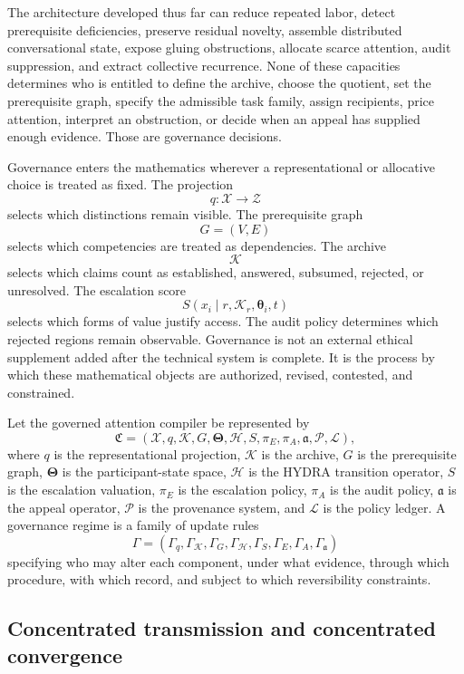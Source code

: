 \documentclass[11pt]{article}
\theoremstyle{definition}
\newcommand{\K}{\mathcal{K}}
\newcommand{\ThetaSpace}{\boldsymbol{\Theta}}
\newcommand{\thetaState}{\boldsymbol{\theta}}
\begin{document}
The architecture developed thus far can reduce repeated labor, detect prerequisite deficiencies, preserve residual novelty, assemble distributed conversational state, expose gluing obstructions, allocate scarce attention, audit suppression, and extract collective recurrence. None of these capacities determines who is entitled to define the archive, choose the quotient, set the prerequisite graph, specify the admissible task family, assign recipients, price attention, interpret an obstruction, or decide when an appeal has supplied enough evidence. Those are governance decisions.

Governance enters the mathematics wherever a representational or allocative choice is treated as fixed. The projection
\[
q:\mathcal{X}\to\mathcal{Z}
\]
selects which distinctions remain visible. The prerequisite graph
\[
G=(V,E)
\]
selects which competencies are treated as dependencies. The archive
\[
\K
\]
selects which claims count as established, answered, subsumed, rejected, or unresolved. The escalation score
\[
S(x_i\mid r,\K_r,\thetaState_i,t)
\]
selects which forms of value justify access. The audit policy determines which rejected regions remain observable. Governance is not an external ethical supplement added after the technical system is complete. It is the process by which these mathematical objects are authorized, revised, contested, and constrained.

Let the governed attention compiler be represented by
\[
\mathfrak{C}
=
\left(
\mathcal{X},
q,
\K,
G,
\ThetaSpace,
\mathcal{H},
S,
\pi_E,
\pi_A,
\mathfrak{a},
\mathcal{P},
\mathcal{L}
\right),
\]
where \(q\) is the representational projection, \(\K\) is the archive, \(G\) is the prerequisite graph, \(\ThetaSpace\) is the participant-state space, \(\mathcal{H}\) is the HYDRA transition operator, \(S\) is the escalation valuation, \(\pi_E\) is the escalation policy, \(\pi_A\) is the audit policy, \(\mathfrak{a}\) is the appeal operator, \(\mathcal{P}\) is the provenance system, and \(\mathcal{L}\) is the policy ledger. A governance regime is a family of update rules
\[
\Gamma
=
\left(
\Gamma_q,
\Gamma_{\K},
\Gamma_G,
\Gamma_{\mathcal{H}},
\Gamma_S,
\Gamma_E,
\Gamma_A,
\Gamma_{\mathfrak{a}}
\right)
\]
specifying who may alter each component, under what evidence, through which procedure, with which record, and subject to which reversibility constraints.

\subsection{Concentrated transmission and concentrated convergence}
\end{document}
